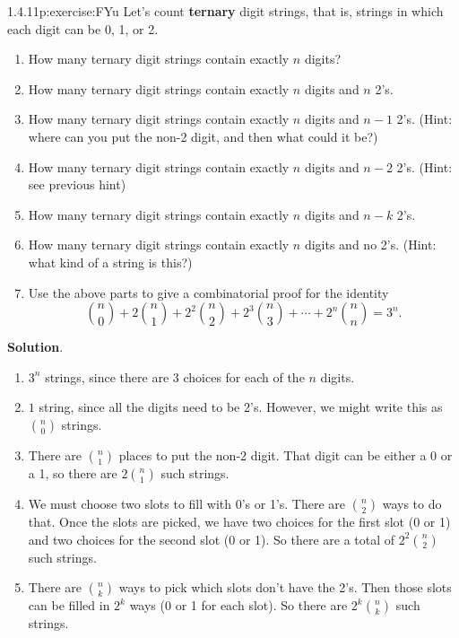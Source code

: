 \documentclass[twoside,11pt,]{book}
\newcommand{\blocktitlefont}{\relax}
\newcommand{\terminology}[1]{\textbf{#1}}
\numberwithin{equation}{chapter}
\begin{document}
\begin{divisionsolution}{1.4.11}{}{p:exercise:FYu}%
Let's count \terminology{ternary} digit strings, that is, strings in which each digit can be 0, 1, or 2.%
\begin{enumerate}[label=(\alph*)]
\item{}How many ternary digit strings contain exactly \(n\) digits?%
\item{}How many ternary digit strings contain exactly \(n\) digits and \(n\) 2's.%
\item{}How many ternary digit strings contain exactly \(n\) digits and \(n-1\) 2's. (Hint: where can you put the non-2 digit, and then what could it be?)%
\item{}How many ternary digit strings contain exactly \(n\) digits and \(n-2\) 2's. (Hint: see previous hint)%
\item{}How many ternary digit strings contain exactly \(n\) digits and \(n-k\) 2's.%
\item{}How many ternary digit strings contain exactly \(n\) digits and no 2's. (Hint: what kind of a string is this?)%
\item{}Use the above parts to give a combinatorial proof for the identity%
\begin{equation*}
{n \choose 0} + 2{n \choose 1} + 2^2{n \choose 2} + 2^3{n \choose 3} + \cdots + 2^n{n \choose n} = 3^n\text{.}
\end{equation*}
%
\end{enumerate}
%
\par\smallskip%
\noindent\textbf{\blocktitlefont Solution}.\quad{}%
\begin{enumerate}[label=(\alph*)]
\item{}\(3^n\) strings, since there are 3 choices for each of the \(n\) digits.%
\item{}\(1\) string, since all the digits need to be 2's. However, we might write this as \({n \choose 0}\) strings.%
\item{}There are \({n \choose 1}\) places to put the non-2 digit. That digit can be either a 0 or a 1, so there are \(2{n \choose 1}\) such strings.%
\item{}We must choose two slots to fill with 0's or 1's. There are \({n \choose 2}\) ways to do that. Once the slots are picked, we have two choices for the first slot (0 or 1) and two choices for the second slot (0 or 1). So there are a total of \(2^2{n \choose 2}\) such strings.%
\item{}There are \({n \choose k}\) ways to pick which slots don't have the 2's. Then those slots can be filled in \(2^k\) ways (0 or 1 for each slot). So there are \(2^k{n \choose k}\) such strings.%

\end{enumerate}
\end{divisionsolution}
\end{document}
